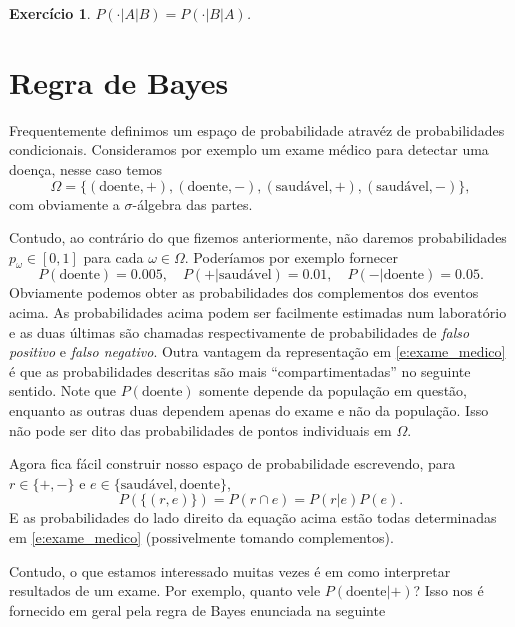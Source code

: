 \documentclass[reqno]{article}
\newcommand*\1{\mathds{1}}
\newtheorem{exercise}[example]{Exercício}
\begin{document}
\begin{exercise}
  $P(\cdot|A|B) = P(\cdot|B|A)$.
\end{exercise}

\section{Regra de Bayes}

Frequentemente definimos um espaço de probabilidade atravéz de probabilidades condicionais.
Consideramos por exemplo um exame médico para detectar uma doença, nesse caso temos
\begin{equation}
  \Omega = \{(\text{doente}, +), (\text{doente}, -), (\text{saudável}, +), (\text{saudável}, -)\},
\end{equation}
com obviamente a $\sigma$-álgebra das partes.

Contudo, ao contrário do que fizemos anteriormente, não daremos probabilidades $p_\omega \in [0,1]$ para cada $\omega \in \Omega$.
Poderíamos por exemplo fornecer
\begin{equation}
  \label{e:exame_medico}
  P(\text{doente}) = 0.005, \quad P( + | \text{saudável}) = 0.01, \quad P( - | \text{doente}) = 0.05.
\end{equation}
Obviamente podemos obter as probabilidades dos complementos dos eventos acima.
As probabilidades acima podem ser facilmente estimadas num laboratório e as duas últimas são chamadas respectivamente de probabilidades de \emph{falso positivo} e \emph{falso negativo}.
Outra vantagem da representação em \eqref{e:exame_medico} é que as probabilidades descritas são mais ``compartimentadas'' no seguinte sentido.
Note que $P(\text{doente})$ somente depende da população em questão, enquanto as outras duas dependem apenas do exame e não da população.
Isso não pode ser dito das probabilidades de pontos individuais em $\Omega$.

Agora fica fácil construir nosso espaço de probabilidade escrevendo, para $r \in \{+, -\}$ e $e \in \{\text{saudável}, \text{doente}\}$,
\begin{equation}
  P(\{(r,e)\}) = P(r \cap e) = P(r | e) P(e).
\end{equation}
E as probabilidades do lado direito da equação acima estão todas determinadas em \eqref{e:exame_medico} (possivelmente tomando complementos).

Contudo, o que estamos interessado muitas vezes é em como interpretar resultados de um exame.
Por exemplo, quanto vele $P(\text{doente} | +)$?
Isso nos é fornecido em geral pela regra de Bayes enunciada na seguinte
\end{document}
